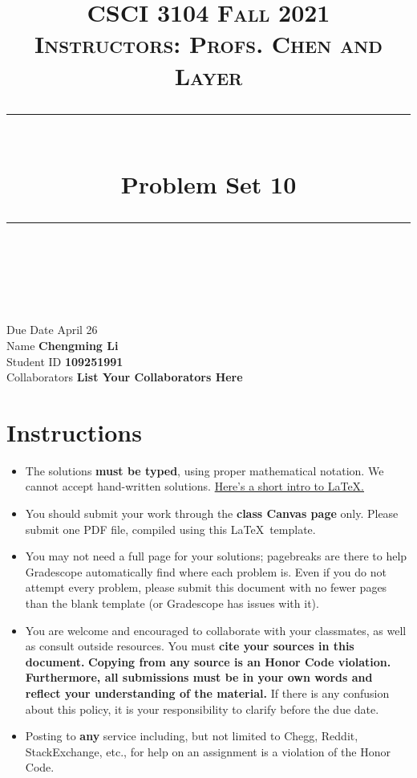 \documentclass[11pt]{article}
\title{
\normalfont \normalsize 
\textsc{CSCI 3104 Fall 2021 \\ 
Instructors: Profs. Chen and Layer} \\
[10pt] 
\rule{\linewidth}{0.5pt} \\[6pt] 
\huge Problem Set 10 \\
\rule{\linewidth}{2pt}  \\[10pt]
}
\date{}
\theoremstyle{definition}
\theoremstyle{definition}
\theoremstyle{definition}
\begin{document}
\maketitle


\noindent
Due Date \dotfill April 26 \\
Name \dotfill \textbf{Chengming Li} \\
Student ID \dotfill \textbf{109251991} \\
Collaborators \dotfill \textbf{List Your Collaborators Here}

\tableofcontents

\section{Instructions}
 \begin{itemize}
	\item The solutions \textbf{must be typed}, using proper mathematical notation. We cannot accept hand-written solutions. \href{http://ece.uprm.edu/~caceros/latex/introduction.pdf}{Here's a short intro to \LaTeX.}
	\item You should submit your work through the \textbf{class Canvas page} only. Please submit one PDF file, compiled using this \LaTeX \ template.
	\item You may not need a full page for your solutions; pagebreaks are there to help Gradescope automatically find where each problem is. Even if you do not attempt every problem, please submit this document with no fewer pages than the blank template (or Gradescope has issues with it).

	\item You are welcome and encouraged to collaborate with your classmates, as well as consult outside resources. You must \textbf{cite your sources in this document.} \textbf{Copying from any source is an Honor Code violation. Furthermore, all submissions must be in your own words and reflect your understanding of the material.} If there is any confusion about this policy, it is your responsibility to clarify before the due date. 

	\item Posting to \textbf{any} service including, but not limited to Chegg, Reddit, StackExchange, etc., for help on an assignment is a violation of the Honor Code.
\end{itemize}
\end{document}
